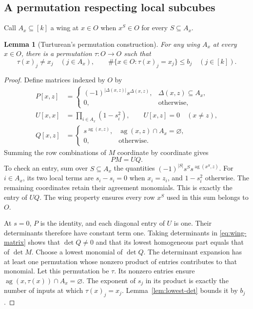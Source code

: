 \documentclass[11pt,reqno]{amsart}
\newtheorem{lemma}[theorem]{Lemma}
\theoremstyle{definition}
\theoremstyle{remark}
\newcommand{\ag}{\operatorname{ag}}
\numberwithin{equation}{section}
\begin{document}
\subsection{A permutation respecting local subcubes}

Call $A_x\subseteq[k]$ a wing at $x\in O$ when $x^S\in O$ for every
$S\subseteq A_x$.

\begin{lemma}[Turturean's permutation construction]\label{lem:permutation}
For any wing $A_x$ at every $x\in O$, there is a permutation
$\tau\colon O\to O$ such that
\[
 \tau(x)_j\ne x_j\quad(j\in A_x),\qquad
 \#\{x\in O:\tau(x)_j=x_j\}\le b_j\quad(j\in[k]).
\]
\end{lemma}

\begin{proof}
Define matrices indexed by $O$ by
\begin{align*}
 P[x,z]&=\begin{cases}(-1)^{|\Delta(x,z)|}s^{\Delta(x,z)},
                      &\Delta(x,z)\subseteq A_x,\\0,&\text{otherwise},\end{cases}\\
 U[x,x]&=\prod_{i\in A_x}(1-s_i^2),\qquad U[x,z]=0\quad(x\ne z),\\
 Q[x,z]&=\begin{cases}s^{\ag(x,z)},&\ag(x,z)\cap A_x=\varnothing,\\
                       0,&\text{otherwise}.
                       \end{cases}
\end{align*}
Summing the row combinations of $M$ coordinate by coordinate gives
\begin{equation}\label{eq:wing-matrix}
 PM=UQ.
\end{equation}
To check an entry, sum over $S\subseteq A_x$ the quantities
$(-1)^{|S|}s^S s^{\ag(x^S,z)}$. For $i\in A_x$, its two local terms
are $s_i-s_i=0$ when $x_i=z_i$, and $1-s_i^2$ otherwise. The remaining
coordinates retain their agreement monomials. This is exactly the
entry of $UQ$. The wing property ensures every row $x^S$ used in this
sum belongs to $O$.

At $s=0$, $P$ is the identity, and each diagonal entry of $U$ is one.
Their determinants therefore have constant term one. Taking
determinants in \eqref{eq:wing-matrix} shows that $\det Q\ne0$ and that
its lowest homogeneous part equals that of $\det M$.
Choose a lowest monomial of $\det Q$. The determinant expansion has at
least one permutation whose nonzero product of entries contributes to
that monomial. Let this permutation be $\tau$.
Its nonzero entries ensure $\ag(x,\tau(x))\cap A_x=\varnothing$.
The exponent of $s_j$ in its product is exactly the number of inputs
at which $\tau(x)_j=x_j$. Lemma~\ref{lem:lowest-det} bounds it by $b_j$.
\end{proof}
\end{document}

